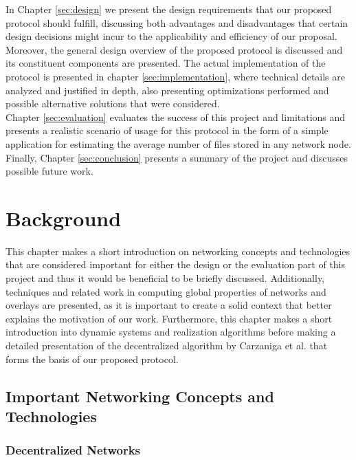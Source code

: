 \documentclass[a4paper,11pt,twoside]{report}
\begin{document}
In Chapter \ref{sec:design} we present the design requirements that our proposed protocol should fulfill, discussing both advantages and disadvantages that certain design decisions might incur to the applicability and efficiency of our proposal. Moreover, the general design overview of the proposed protocol is discussed and its constituent components are presented. The actual implementation of the protocol is presented in chapter \ref{sec:implementation}, where technical details are analyzed and justified in depth, also presenting optimizations performed and possible alternative solutions that were considered.\\

Chapter \ref{sec:evaluation} evaluates the success of this project and limitations and presents a realistic scenario of usage for this protocol in the form of a simple application for estimating the average number of files stored in any network node. Finally, Chapter \ref{sec:conclusion} presents a summary of the project and discusses possible future work.


\chapter{Background}
\label{sec:background}

This chapter makes a short introduction on networking concepts and technologies that are considered important for either the design or the evaluation part of this project and thus it would be beneficial to be briefly discussed. Additionally, techniques and related work in computing global properties of networks and overlays are presented, as it is important to create a solid context that better explains the motivation of our work. Furthermore, this chapter makes a short introduction into dynamic systems and realization algorithms before making a detailed presentation of the decentralized algorithm by Carzaniga et al. \cite{6195806} that forms the basis of our proposed protocol.

\section{Important Networking Concepts and Technologies} 

\subsection{Decentralized Networks}
\end{document}
